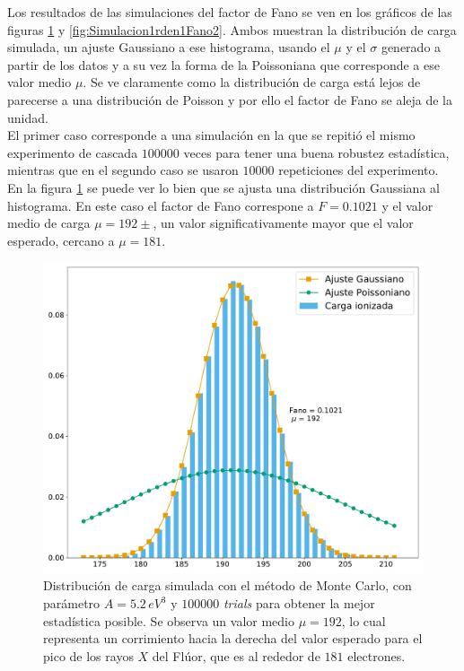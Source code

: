 \indent Los resultados de las simulaciones del factor de Fano se ven en los gráficos de las figuras \ref{fig:Simulacion1rden1Fano1} y \ref{fig:Simulacion1rden1Fano2}. Ambos muestran la distribución de carga simulada, un ajuste Gaussiano a ese histograma, usando el $\mu$ y el $\sigma$ generado a partir de los datos y a su vez la forma de la Poissoniana que corresponde a ese valor medio $\mu$. Se ve claramente como la distribución de carga está lejos de parecerse a una distribución de Poisson y por ello el factor de Fano se aleja de la unidad.\\
\indent El primer caso corresponde a una simulación en la que se repitió el mismo experimento de cascada $100000$ veces para tener una buena robustez estadística, mientras que en el segundo caso se usaron $10000$ repeticiones del experimento.\\
\indent En la figura \ref{fig:Simulacion1rden1Fano1} se puede ver lo bien que se ajusta una distribución Gaussiana al histograma. En este caso el factor de Fano correspone a $F = 0.1021$ y el valor medio de carga $\mu = 192 \pm $, un valor significativamente mayor que el valor esperado, cercano a $\mu = 181$.
\begin{figure}%
    \centering
    \includegraphics[scale=0.35]{Figs/Fano_677_Eloss0_100ktrials.pdf}
    \caption{\footnotesize{Distribución de carga simulada con el método de Monte Carlo, con parámetro $A = 5.2\,\si{eV}^{3}$ y $100000$ \textit{trials} para obtener la mejor estadística posible. Se observa un valor medio $\mu = 192$, lo cual representa un corrimiento hacia la derecha del valor esperado para el pico de los rayos $X$ del Flúor, que es al rededor de $181$ electrones.}}
    \label{fig:Simulacion1rden1Fano1}
\end{figure}
